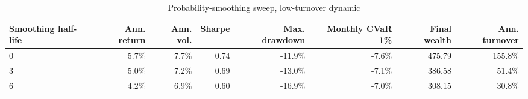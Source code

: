 ﻿\begin{table}[!htbp]
\centering
\caption{Probability-smoothing sweep, low-turnover dynamic}
\label{tab:allocation-smoothing-low-turnover}
\small
\setlength{\tabcolsep}{5pt}
\renewcommand{\arraystretch}{1.12}
\begin{adjustbox}{center,max width=\linewidth}
\begin{tabular}{lrrrrrrr}
\toprule
Smoothing half-life & Ann. return & Ann. vol. & Sharpe & Max. drawdown & Monthly CVaR 1\% & Final wealth & Ann. turnover \\
\midrule
0 & 5.7\% & 7.7\% & 0.74 & -11.9\% & -7.6\% & 475.79 & 155.8\% \\
3 & 5.0\% & 7.2\% & 0.69 & -13.0\% & -7.1\% & 386.58 & 51.4\% \\
6 & 4.2\% & 6.9\% & 0.60 & -16.9\% & -7.0\% & 308.15 & 30.8\% \\
\bottomrule
\end{tabular}
\end{adjustbox}
\end{table}
